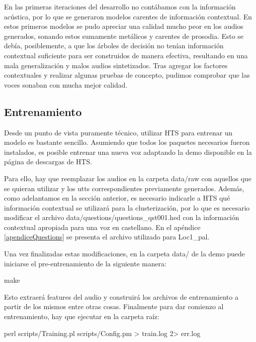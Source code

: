 En las primeras iteraciones del desarrollo no contábamos con la información acústica, por lo que se generaron modelos carentes de información contextual. En estos primeros modelos se pudo apreciar una calidad mucho peor en los audios generados, sonando estos sumamente metálicos y carentes de prosodia. Esto se debía, posiblemente, a que los árboles de decisión no tenían información contextual suficiente para ser construidos de manera efectiva, resultando en una mala generalización y malos audios sintetizados. Tras agregar los factores contextuales y realizar algunas pruebas de concepto, pudimos comprobar que las voces sonaban con mucha mejor calidad.


\subsection{Entrenamiento} \label{entrenamientoHTS}

Desde un punto de vista puramente técnico, utilizar HTS para entrenar un modelo es bastante sencillo. Asumiendo que todos los paquetes necesarios fueron instalados, es posible entrenar una nueva voz adaptando la demo disponible en la página de descargas de HTS.

Para ello, hay que reemplazar los audios en la carpeta data/raw con aquellos que se quieran utilizar y los utts correspondientes previamente generados. Además, como adelantamos en la sección anterior, es necesario indicarle a HTS qué información contextual se utilizará para la clusterización, por lo que es necesario modificar el archivo data/questions/questions\_qst001.hed con la información contextual apropiada para una voz en castellano. En el apéndice \ref{apendiceQuestions} se presenta el archivo utilizado para Loc1\_pal.

Una vez finalizadas estas modificaciones, en la carpeta data/ de la demo puede iniciarse el pre-entrenamiento de la siguiente manera:

\begin{tcolorbox}
make
\end{tcolorbox}

\noindent Esto extraerá features del audio y construirá los archivos de entrenamiento a partir de los mismos entre otras cosas. Finalmente para dar comienzo al entrenamiento, hay que ejecutar en la carpeta raíz:

\begin{tcolorbox}
perl scripts/Training.pl scripts/Config.pm > train.log 2> err.log
\end{tcolorbox}

